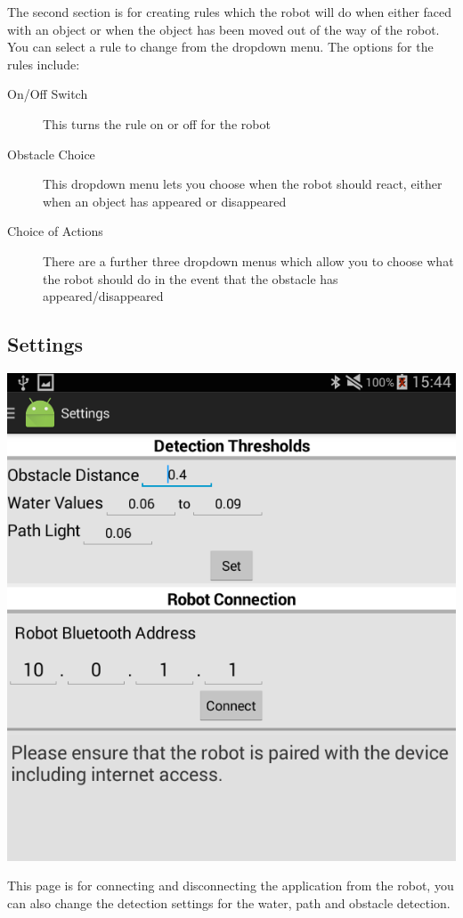 \documentclass[]{article}   	%
\begin{document}
{\par{The second section is for creating rules which the robot will do when either faced with an object or when the object has been moved out of the way of the robot. You can select a rule to change from the dropdown menu. The options for the rules include:
\begin{description}
	\item[On/Off Switch] This turns the rule on or off for the robot
	\item[Obstacle Choice] This dropdown menu lets you choose when the robot should react, either when an object has appeared or disappeared
	\item[Choice of Actions] There are a further three dropdown menus which allow you to choose what the robot should do in the event that the obstacle has appeared/disappeared
\end{description}
}

\subsection{Settings}
\par{
\begin{center}
	\includegraphics[scale=0.4]{settings.png}
\end{center}			
}
\par{This page is for connecting and disconnecting the application from the robot, you can also change the detection settings for the water, path and obstacle detection.}

}
\end{document}

